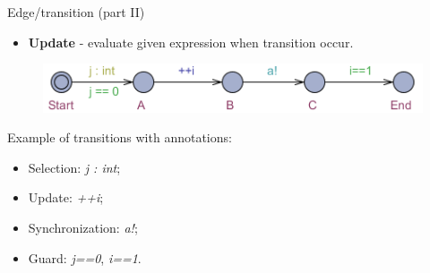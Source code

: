 \documentclass{beamer}
\begin{document}
\begin{frame}{Edge/transition (part II)}
	\begin{itemize}
		\item \textbf{Update} - evaluate given expression when transition occur.
	\end{itemize}	
	
	\begin{figure}[H]
		\includegraphics[scale=0.8]{img/uppaal_transitions.png}
	\end{figure}
	Example of transitions with annotations:
	\begin{itemize}
		\item Selection: \textit{j : int};
		\item Update: \textit{++i};
		\item Synchronization: \textit{a!};
		\item Guard: \textit{j==0}, \textit{i==1}.
	\end{itemize}
\end{frame}
\end{document}
